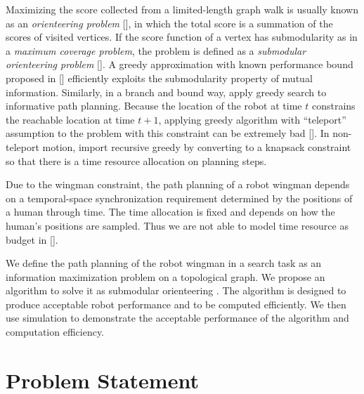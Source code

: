 \documentclass[12pt]{article}
\begin{document}
Maximizing the score collected from a limited-length graph walk is usually known as an \emph{orienteering problem} [\cite{Vansteenwegen20111}], in which the total score is a summation of the scores of visited vertices.
If the score function of a vertex has submodularity as in a \emph{maximum coverage problem}, the problem is defined as a \emph{submodular orienteering problem} [\cite{chekuri2005recursive}].
A greedy approximation with known performance bound proposed in [\cite{singh2009efficient}] efficiently exploits the submodularity property of mutual information.
Similarly, in a branch and bound way, \cite{binney2012branch} apply greedy search to informative path planning.
Because the location of the robot at time $ t $ constrains the reachable location at time $ t+1 $, applying greedy algorithm with ``teleport'' assumption to the problem with this constraint can be extremely bad [\cite{krause2012submodular}].
In non-teleport motion, \cite{chekuri2005recursive} import recursive greedy by converting to a knapsack constraint so that there is a time resource allocation on planning steps.

Due to the wingman constraint, the path planning of a robot wingman depends on a temporal-space synchronization requirement determined by the positions of a human through time.
The time allocation is fixed and depends on how the human's positions are sampled.
Thus we are not able to model time resource as budget in [\cite{chekuri2005recursive}].   

We define the path planning of the robot wingman in a search task as an information maximization problem on a topological graph. We propose an algorithm to solve it as submodular orienteering . The algorithm is designed to produce acceptable robot performance and to be computed efficiently. We then use simulation to demonstrate the acceptable performance of the algorithm and computation efficiency. 

\section{Problem Statement}
\label{sec:problem_statement}
\end{document}
